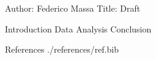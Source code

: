 
Author: Federico Massa
Title: Draft

Introduction
Data
Analysis
Conclusion

References
./references/ref.bib
